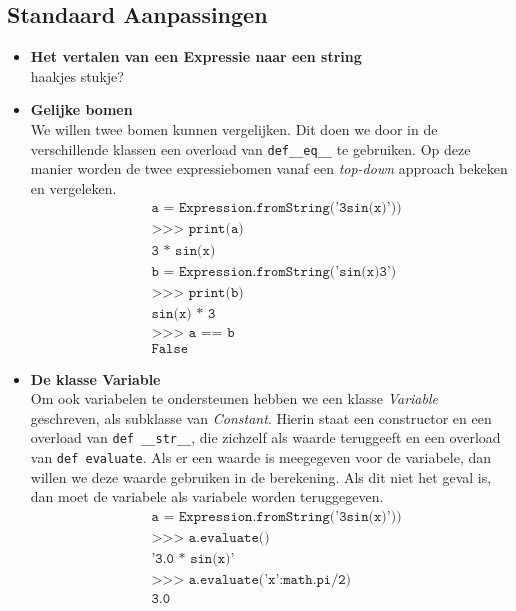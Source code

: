 \documentclass[12pt]{article}
\begin{document}
\subsection*{Standaard Aanpassingen}
\begin{itemize}
\item \textbf{Het vertalen van een Expressie naar een string} \\
haakjes stukje?

\item \textbf{Gelijke bomen} \\
We willen twee bomen kunnen vergelijken. Dit doen we door in de verschillende klassen een overload van \texttt{def\_\_eq\_\_} te gebruiken. Op deze manier worden de twee expressiebomen vanaf een \textit{top-down} approach bekeken en vergeleken.
\begin{align*}
&\texttt{a = Expression.fromString('3sin(x)'))}\\
&\texttt{>>> print(a)}\\
&\texttt{3 * sin(x)}\\
&\texttt{b = Expression.fromString('sin(x)3')}\\
&\texttt{>>> print(b)}\\
&\texttt{sin(x) * 3}\\
&\texttt{>>> a == b}\\
&\texttt{False}
\end{align*}


\item \textbf{De klasse Variable} \\
Om ook variabelen te ondersteunen hebben we een klasse \textit{Variable} geschreven, als subklasse van \textit{Constant}. Hierin staat een constructor en een overload van  \texttt{def \_\_str\_\_}, die zichzelf als waarde teruggeeft en een overload van \texttt{def evaluate}. Als er een waarde is meegegeven voor de variabele, dan willen we deze waarde gebruiken in de berekening. Als dit niet het geval is, dan moet de variabele als variabele worden teruggegeven.
\begin{align*}
&\texttt{a = Expression.fromString('3sin(x)'))}\\
&\texttt{>>> a.evaluate()}\\
&\texttt{'3.0 * sin(x)'}\\
&\texttt{>>> a.evaluate({'x':math.pi/2})}\\
&\texttt{3.0}\\
\end{align*}


\end{itemize}
\end{document}
